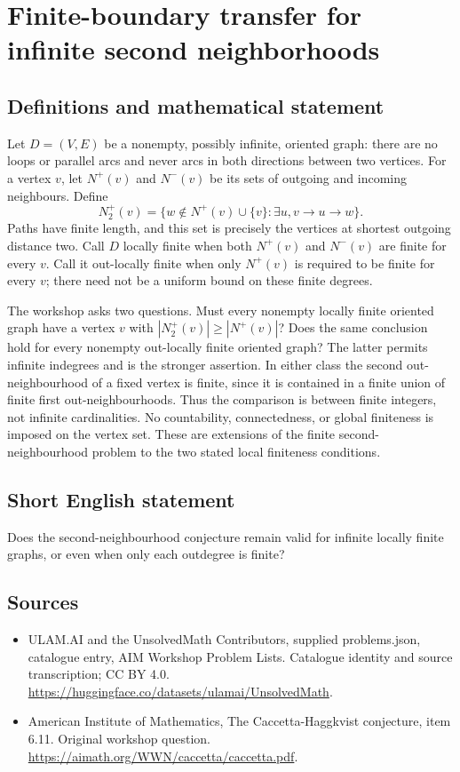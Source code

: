 \documentclass[11pt,a4paper]{article}
\begin{document}
\section*{Finite-boundary transfer for infinite second neighborhoods}\label{statement}

\subsection{Definitions and mathematical statement}
Let $D=(V,E)$ be a nonempty, possibly infinite, oriented graph: there
are no loops or parallel arcs and never arcs in both directions
between two vertices. For a vertex $v$, let $N^+(v)$ and $N^-(v)$
be its sets of outgoing and incoming neighbours. Define
\[
 N_2^+(v)=\{w\notin N^+(v)\cup\{v\}:\exists u, v\to u\to w\}.
\]
Paths have finite length, and this set is precisely the vertices at
shortest outgoing distance two.
Call $D$ locally finite when both $N^+(v)$ and $N^-(v)$ are finite
for every $v$. Call it out-locally finite when only $N^+(v)$ is
required to be finite for every $v$; there need not be a uniform
bound on these finite degrees.

The workshop asks two questions. Must every nonempty locally finite
oriented graph have a vertex $v$ with
$|N_2^+(v)|\ge|N^+(v)|$? Does the same conclusion hold for every
nonempty out-locally finite oriented graph?
The latter permits infinite indegrees and is the stronger assertion.
In either class the second out-neighbourhood of a fixed vertex is
finite, since it is contained in a finite union of finite first
out-neighbourhoods. Thus the comparison is between finite integers,
not infinite cardinalities. No countability, connectedness, or global
finiteness is imposed on the vertex set. These are extensions of the
finite second-neighbourhood problem to the two stated local finiteness
conditions.
\subsection{Short English statement}
Does the second-neighbourhood conjecture remain valid for infinite locally finite graphs, or even when only each outdegree is finite?
\subsection{Sources}
\begin{itemize}
\item[S1] ULAM.AI and the UnsolvedMath Contributors, supplied problems.json, catalogue entry, AIM Workshop Problem Lists. Catalogue identity and source transcription; CC BY 4.0.
\url{https://huggingface.co/datasets/ulamai/UnsolvedMath}.
\item[S2] American Institute of Mathematics, The Caccetta-Haggkvist conjecture, item 6.11. Original workshop question.
\url{https://aimath.org/WWN/caccetta/caccetta.pdf}.
\end{itemize}
\end{document}
